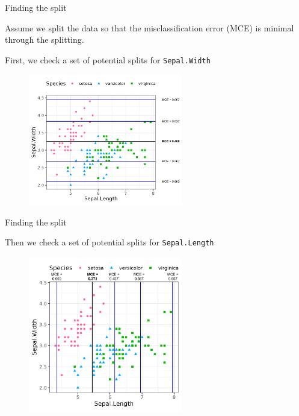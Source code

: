 \documentclass[11pt,compress,t,notes=noshow, xcolor=table]{beamer}
\begin{document}
\begin{vbframe}{Finding the split}

Assume we split the data so that the misclassification error (MCE) is minimal through the splitting.

First, we check a set of potential splits for \texttt{Sepal.Width}

\begin{figure}
\includegraphics[width=0.6\textwidth]{figure/treegrowing-y.pdf}
\end{figure}

\end{vbframe}

\begin{vbframe}{Finding the split}

Then we check a set of potential splits for \texttt{Sepal.Length}

\begin{figure}
\includegraphics[width=0.6\textwidth]{figure/treegrowing-x.pdf}
\end{figure}

\end{vbframe}
\end{document}
